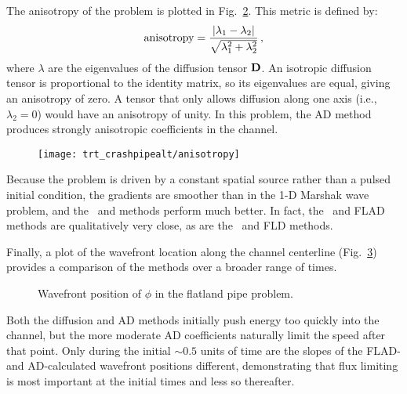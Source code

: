 \begin{figure}[htb]
  \centering\small
  \label{fig:crashaltDcoeff}
\end{figure}

The anisotropy of the problem is plotted in Fig.~\ref{fig:crashaltAnisotropy}.
This metric is defined by:
\begin{equation}\label{eq:anisotropyMetric}
  \text{anisotropy} = \frac{\left| \lambda_1 - \lambda_2 \right| }{ \sqrt{
  \lambda_1^2 + \lambda_2^2} }\,,
\end{equation}
where $\lambda$ are the eigenvalues of the diffusion tensor $\mathbf{D}$. An
isotropic diffusion tensor is proportional to the identity matrix, so its
eigenvalues are equal, giving an anisotropy of zero. A tensor that only allows
diffusion along one axis (i.e., $\lambda_2 = 0$) would have an anisotropy of
unity. In this problem, the AD method produces strongly anisotropic coefficients
in the channel.

\begin{figure}[htb]
  \centering
  \texttt{[image: trt\_crashpipealt/anisotropy]}
  \label{fig:crashaltAnisotropy}
\end{figure}

Because the problem is driven by a constant spatial source rather than a pulsed
initial condition, the gradients are smoother than in the 1-D Marshak wave
problem, and the \Pone\ and \APone methods perform much better. In fact, the
\APone\ and FLAD methods are qualitatively very close, as are the \Pone\ and FLD
methods.

Finally, a plot of the wavefront location along the channel centerline
(Fig.~\ref{fig:crashaltWavefront}) provides a comparison of the methods over a
broader range of times.
%
\begin{figure}[htb]
  \centering\small
  
  \caption{Wavefront position of $\phi$ in the flatland pipe problem.}
  \label{fig:crashaltWavefront}
\end{figure}
%
Both the diffusion and AD methods initially push energy too quickly into the
channel, but the more moderate AD coefficients naturally limit the speed after
that point. Only during the initial $\sim0.5$ units of time are the slopes of the
FLAD- and AD-calculated wavefront positions different, demonstrating that
flux limiting is most important at the initial times and less so thereafter.

